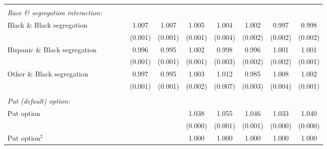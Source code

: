 {\begin{tabular}{l*{10}{c}}
& & & & & \\ 
 \emph{Race \& segregation interaction:} & & & & & \\ 
Black \& Black segregation&                     &                     &                     &       1.007\sym{***}&       1.007\sym{***}&       1.005\sym{***}&       1.004         &       1.002         &       0.997         &       0.998         \\
                    &                     &                     &                     &     (0.001)         &     (0.001)         &     (0.001)         &     (0.004)         &     (0.002)         &     (0.002)         &     (0.002)         \\
Hispanic \& Black segregation&                     &                     &                     &       0.996\sym{***}&       0.995\sym{***}&       1.002\sym{*}  &       0.998         &       0.996         &       1.001         &       1.001         \\
                    &                     &                     &                     &     (0.001)         &     (0.001)         &     (0.001)         &     (0.003)         &     (0.002)         &     (0.002)         &     (0.001)         \\
Other \& Black segregation&                     &                     &                     &       0.997\sym{*}  &       0.995\sym{**} &       1.003\sym{*}  &       1.012         &       0.985\sym{***}&       1.008\sym{*}  &       1.002         \\
                    &                     &                     &                     &     (0.001)         &     (0.001)         &     (0.002)         &     (0.007)         &     (0.003)         &     (0.004)         &     (0.001)         \\
& & & & & \\ 
 \emph{Put (default) option:} & & & & & \\ 
Put option          &                     &                     &                     &                     &                     &       1.038\sym{***}&       1.055\sym{***}&       1.046\sym{***}&       1.033\sym{***}&       1.040\sym{***}\\
                    &                     &                     &                     &                     &                     &     (0.000)         &     (0.001)         &     (0.001)         &     (0.000)         &     (0.000)         \\
Put option$^2$      &                     &                     &                     &                     &                     &       1.000\sym{***}&       1.000\sym{***}&       1.000\sym{***}&       1.000\sym{***}&       1.000\sym{***}\\

\end{tabular}}
